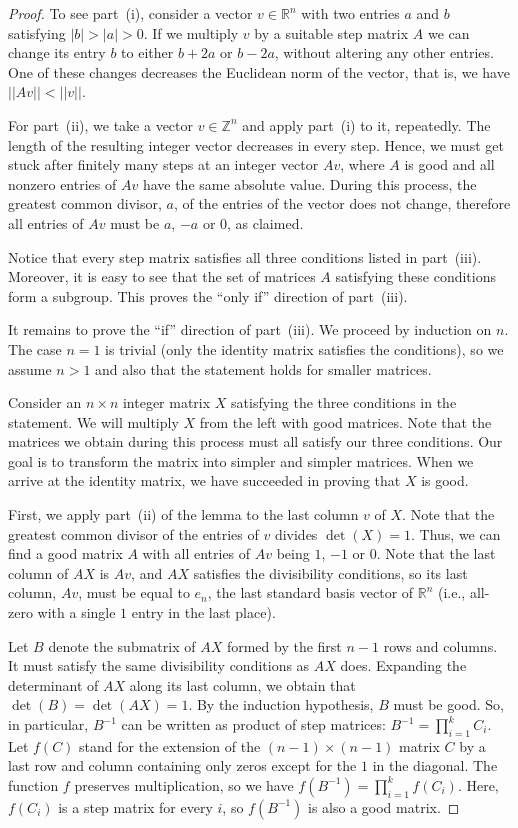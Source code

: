 \documentclass[10pt,a4paper]{amsart}
\newcommand{\R}{\mathbb R}
\newcommand{\Z}{\mathbb Z}
\begin{document}
\begin{proof}
To see part~(i), consider a vector $v\in\R^n$ with two entries $a$ and $b$ satisfying $|b|>|a|>0$. If we multiply $v$ by a suitable step matrix $A$ we can change its entry $b$ to either $b+2a$ or $b-2a$, without altering any other entries. One of these changes decreases the Euclidean norm of the vector, that is, we have $||Av||<||v||.$
\medskip

For part~(ii), we take a vector $v\in\Z^n$ and apply part~(i) to it, repeatedly. The length of the resulting integer vector decreases in every step. Hence, we must get stuck after finitely many steps at an integer vector $Av$, where $A$ is good and all nonzero entries of $Av$ have the same absolute value. During this process, the greatest common divisor, $a$, of the entries of the vector does not change, therefore all entries of $Av$ must be $a$, $-a$ or $0$, as claimed.
\medskip

Notice that every step matrix satisfies all three conditions listed in part~(iii). Moreover, it is easy to see that the set of matrices $A$ satisfying these conditions form a subgroup. This proves the ``only if'' direction of part~(iii).
\medskip

It remains to prove the ``if'' direction of part~(iii). We proceed by induction on $n$. The case $n=1$ is trivial (only the identity matrix satisfies the conditions), so we assume $n>1$ and also that the statement holds for smaller matrices.

\smallskip

Consider an $n\times n$ integer matrix $X$ satisfying the three conditions in the statement. We will multiply $X$ from the left with good matrices. Note that the matrices we obtain during this process must all satisfy our three conditions.
Our goal is to transform the matrix into simpler and simpler matrices. When we arrive at the identity matrix, we have succeeded in proving that $X$ is good.

First, we apply part~(ii) of the lemma to the last column $v$ of $X$. Note that the greatest common divisor of the entries of $v$ divides $\det(X)=1$. Thus, we can find a good matrix $A$ with all entries of $Av$ being $1$, $-1$ or $0$. Note that the last column of $AX$ is $Av$, and $AX$ satisfies the divisibility conditions, so its last column, $Av$, must be equal to $e_n$, the last standard basis vector of $\R^n$ (i.e., all-zero with a single $1$ entry in the last place).

Let $B$ denote the submatrix of $AX$ formed by the first $n-1$ rows and columns. It must satisfy the same divisibility conditions as $AX$ does. Expanding the determinant of $AX$ along its last column, we obtain that $\det(B)=\det(AX)=1.$ By the induction hypothesis, $B$ must be good. So, in particular, $B^{-1}$ can be written as product of step matrices: $B^{-1}=\prod_{i=1}^kC_i$. Let $f(C)$ stand for the extension of the $(n-1)\times(n-1)$ matrix $C$ by a last row and column containing only zeros except for the $1$ in the diagonal. The function $f$ preserves multiplication, so we have $f(B^{-1})=\prod_{i=1}^kf(C_i)$. Here, $f(C_i)$ is a step matrix for every $i$, so $f(B^{-1})$ is also a good matrix.


\end{proof}
\end{document}
